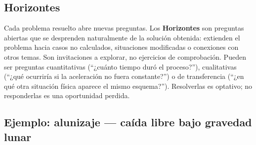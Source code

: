 \documentclass[11pt]{book}
\begin{document}
\begin{enumerate}
\subsection*{Horizontes}

Cada problema resuelto abre nuevas preguntas. Los {\bf Horizontes} son preguntas abiertas que se desprenden naturalmente de la solución obtenida: extienden el problema hacia casos no calculados, situaciones modificadas o conexiones con otros temas. Son invitaciones a explorar, no ejercicios de comprobación. Pueden ser preguntas cuantitativas (``¿cuánto tiempo duró el proceso?''), cualitativas (``¿qué ocurriría si la aceleración no fuera constante?'') o de transferencia (``¿en qué otra situación física aparece el mismo esquema?''). Resolverlas es optativo; no responderlas es una oportunidad perdida.

\end{enumerate}


\subsection*{Ejemplo: alunizaje --- caída libre bajo gravedad lunar}
\end{document}
